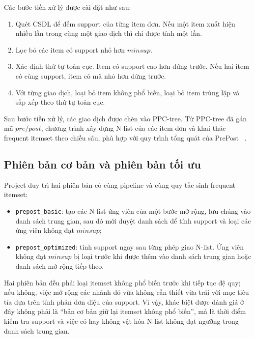 Các bước tiền xử lý được cài đặt như sau:

\begin{enumerate}
    \item Quét CSDL để đếm support của từng item đơn. Nếu một item xuất hiện nhiều lần trong cùng một giao dịch thì chỉ được tính một lần.
    \item Lọc bỏ các item có support nhỏ hơn $\mathit{minsup}$.
    \item Xác định thứ tự toàn cục. Item có support cao hơn đứng trước. Nếu hai item có cùng support, item có mã nhỏ hơn đứng trước.
    \item Với từng giao dịch, loại bỏ item không phổ biến, loại bỏ item trùng lặp và sắp xếp theo thứ tự toàn cục.
\end{enumerate}

Sau bước tiền xử lý, các giao dịch được chèn vào PPC-tree. Từ PPC-tree đã
gán mã $pre/post$, chương trình xây dựng N-list của các item đơn và khai thác
frequent itemset theo chiều sâu, phù hợp với quy trình tổng quát của PrePost
~\cite{deng2012prepost}.

\subsection{Phiên bản cơ bản và phiên bản tối ưu}
\label{subsec:basic-optimized}

Project duy trì hai phiên bản có cùng pipeline và cùng quy tắc sinh
frequent itemset:

\begin{itemize}
    \item \texttt{prepost\_basic}: tạo các N-list ứng viên của một bước mở rộng,
          lưu chúng vào danh sách trung gian, sau đó mới duyệt danh sách để tính
          support và loại các ứng viên không đạt $\mathit{minsup}$;
    \item \texttt{prepost\_optimized}: tính support ngay sau từng phép giao
          N-list. Ứng viên không đạt $\mathit{minsup}$ bị loại trước khi được
          thêm vào danh sách trung gian hoặc danh sách mở rộng tiếp theo.
\end{itemize}

Hai phiên bản đều phải loại itemset không phổ biến trước khi tiếp tục đệ quy;
nếu không, việc mở rộng các nhánh đó vừa không cần thiết vừa trái với mục tiêu
tỉa dựa trên tính phản đơn điệu của support. Vì vậy, khác biệt được đánh giá ở
đây không phải là ``bản cơ bản giữ lại itemset không phổ biến'', mà là thời điểm
kiểm tra support và việc có hay không vật hóa N-list không đạt ngưỡng trong
danh sách trung gian.

